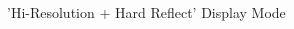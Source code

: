 \clearpage
\begin{figure}[H]
    \centering
    \begin{adjustbox}{width=12cm,center}
    \end{adjustbox}
\caption{'Hi-Resolution + Hard Reflect' Display Mode}
\end{figure}


